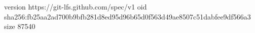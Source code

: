 version https://git-lfs.github.com/spec/v1
oid sha256:fb25aa2ad700b9bfb281d8ed95d96b65d0f563d49ae8507c51dabfee9df566a3
size 87540
